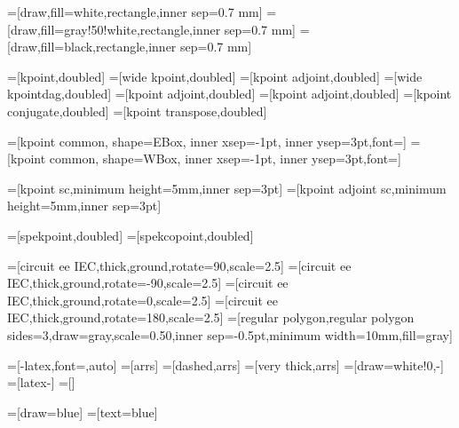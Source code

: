 =[draw,fill=white,rectangle,inner sep=0.7 mm]
=[draw,fill=gray!50!white,rectangle,inner sep=0.7 mm]
=[draw,fill=black,rectangle,inner sep=0.7 mm]

=[kpoint,doubled]
=[wide kpoint,doubled]
=[kpoint adjoint,doubled]
=[wide kpointdag,doubled]
=[kpoint adjoint,doubled]
=[kpoint adjoint,doubled]
=[kpoint conjugate,doubled]
=[kpoint transpose,doubled]

=[kpoint common, shape=EBox, inner xsep=-1pt, inner ysep=3pt,font=\small]
=[kpoint common, shape=WBox, inner xsep=-1pt, inner ysep=3pt,font=\small]

=[kpoint sc,minimum height=5mm,inner sep=3pt]
=[kpoint adjoint sc,minimum height=5mm,inner sep=3pt]

=[spekpoint,doubled]
=[spekcopoint,doubled]



 =[circuit ee IEC,thick,ground,rotate=90,scale=2.5]
 =[circuit ee IEC,thick,ground,rotate=-90,scale=2.5]
 =[circuit ee IEC,thick,ground,rotate=0,scale=2.5]
 =[circuit ee IEC,thick,ground,rotate=180,scale=2.5]
 =[regular polygon,regular polygon sides=3,draw=gray,scale=0.50,inner sep=-0.5pt,minimum width=10mm,fill=gray]


=[-latex,font=\small,auto]
=[arrs]
=[dashed,arrs]
=[very thick,arrs]
=[draw=white!0,-]
=[latex-]
=[]



=[draw=blue]
=[text=blue]

